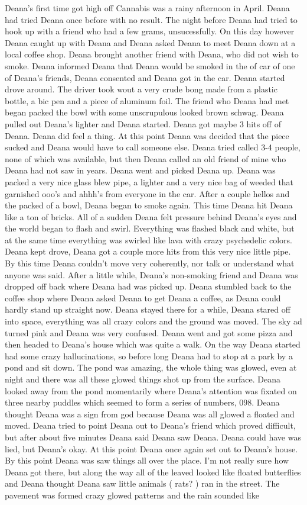 \documentclass[12pt]{book}
\begin{document}
Deana's first time got high off Cannabis was a rainy afternoon in April. Deana had tried Deana once before with no result. The night before Deana had tried to hook up with a friend who had a few grams, unsucessfully. On this day however Deana caught up with Deana and Deana asked Deana to meet Deana down at a local coffee shop. Deana brought another friend with Deana, who did not wish to smoke. Deana informed Deana that Deana would be smoked in the of car of one of Deana's friends, Deana consented and Deana got in the car. Deana started drove around. The driver took wout a very crude bong made from a plastic bottle, a bic pen and a piece of aluminum foil. The friend who Deana had met began packed the bowl with some unscrupulous looked brown schwag. Deana pulled out Deana's lighter and Deana started. Deana got maybe 3 hits off of Deana. Deana did feel a thing. At this point Deana was decided that the piece sucked and Deana would have to call someone else. Deana tried called 3-4 people, none of which was available, but then Deana called an old friend of mine who Deana had not saw in years. Deana went and picked Deana up. Deana was packed a very nice glass blew pipe, a lighter and a very nice bag of weeded that garnished ooo's and ahhh's from everyone in the car. After a couple hellos and the packed of a bowl, Deana began to smoke again. This time Deana hit Deana like a ton of bricks. All of a sudden Deana felt pressure behind Deana's eyes and the world began to flash and swirl. Everything was flashed black and white, but at the same time everything was swirled like lava with crazy psychedelic colors. Deana kept drove, Deana got a couple more hits from this very nice little pipe. By this time Deana couldn't move very coherently, nor talk or understand what anyone was said. After a little while, Deana's non-smoking friend and Deana was dropped off back where Deana had was picked up. Deana stumbled back to the coffee shop where Deana asked Deana to get Deana a coffee, as Deana could hardly stand up straight now. Deana stayed there for a while, Deana stared off into space, everything was all crazy colors and the ground was moved. The sky ad turned pink and Deana was very confused. Deana went and got some pizza and then headed to Deana's house which was quite a walk. On the way Deana started had some crazy hallucinations, so before long Deana had to stop at a park by a pond and sit down. The pond was amazing, the whole thing was glowed, even at night and there was all these glowed things shot up from the surface. Deana looked away from the pond momentarily where Deana's attention was fixated on three nearby puddles which seemed to form a series of numbers, 098. Deana thought Deana was a sign from god because Deana was all glowed a floated and moved. Deana tried to point Deana out to Deana's friend which proved difficult, but after about five minutes Deana said Deana saw Deana. Deana could have was lied, but Deana's okay. At this point Deana once again set out to Deana's house. By this point Deana was saw things all over the place. I'm not really sure how Deana got there, but along the way all of the leaved looked like floated butterflies and Deana thought Deana saw little animals ( rats? ) ran in the street. The pavement was formed crazy glowed patterns and the rain sounded like 
\end{document}
